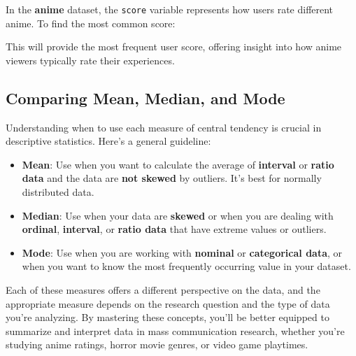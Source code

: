 \documentclass[
]{book}
\newenvironment{Shaded}{\begin{snugshade}}{\end{snugshade}}
\newcommand{\CommentTok}[1]{\textcolor[rgb]{0.56,0.35,0.01}{\textit{#1}}}
\newcommand{\FunctionTok}[1]{\textcolor[rgb]{0.13,0.29,0.53}{\textbf{#1}}}
\newcommand{\NormalTok}[1]{#1}
\newcommand{\OtherTok}[1]{\textcolor[rgb]{0.56,0.35,0.01}{#1}}
\newcommand{\SpecialCharTok}[1]{\textcolor[rgb]{0.81,0.36,0.00}{\textbf{#1}}}
\providecommand{\tightlist}{%
  \setlength{\itemsep}{0pt}\setlength{\parskip}{0pt}}
\begin{document}
In the \textbf{anime} dataset, the \texttt{score} variable represents how users rate different anime. To find the most common score:

\begin{Shaded}
\end{Shaded}

This will provide the most frequent user score, offering insight into how anime viewers typically rate their experiences.

\subsection*{Comparing Mean, Median, and Mode}\label{comparing-mean-median-and-mode}

Understanding when to use each measure of central tendency is crucial in descriptive statistics. Here's a general guideline:

\begin{itemize}
\tightlist
\item
  \textbf{Mean}: Use when you want to calculate the average of \textbf{interval} or \textbf{ratio data} and the data are \textbf{not skewed} by outliers. It's best for normally distributed data.
\item
  \textbf{Median}: Use when your data are \textbf{skewed} or when you are dealing with \textbf{ordinal}, \textbf{interval}, or \textbf{ratio data} that have extreme values or outliers.
\item
  \textbf{Mode}: Use when you are working with \textbf{nominal} or \textbf{categorical data}, or when you want to know the most frequently occurring value in your dataset.
\end{itemize}

Each of these measures offers a different perspective on the data, and the appropriate measure depends on the research question and the type of data you're analyzing. By mastering these concepts, you'll be better equipped to summarize and interpret data in mass communication research, whether you're studying anime ratings, horror movie genres, or video game playtimes.
\end{document}
